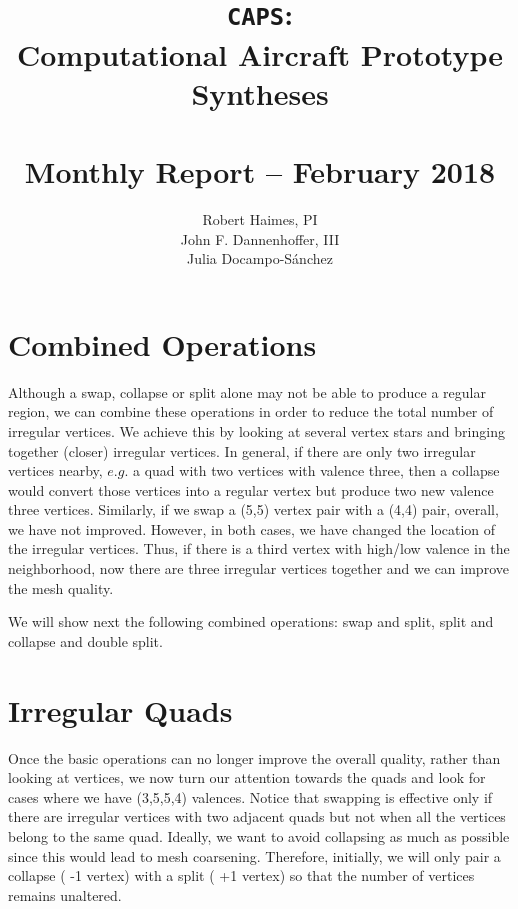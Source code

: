 \documentclass[titlepage]{article}
\title{{\tt CAPS}: \\ Computational Aircraft Prototype Syntheses \\ ~ \\ \Large Monthly Report -- February 2018\\[0.04in]
}
\author{Robert Haimes, PI \\ John F. Dannenhoffer, III
\\ Julia Docampo-S\'anchez
}
\begin{document}


  \maketitle

  \MakeRptDocPage
  

\newpage
  \section{Combined Operations}
  Although a swap, collapse or split alone may not be able to produce a regular region,  we can 
  combine these operations in order to reduce the total number of irregular vertices. We 
  achieve this by looking at several vertex stars and bringing together (closer) irregular vertices. 
   In general, if there are only two irregular vertices nearby, 
   $e.g.$ a quad with two vertices with valence three, then a collapse would convert those vertices 
   into a regular vertex but produce two new valence three vertices. Similarly, if we swap a (5,5) vertex 
   pair with  a (4,4) pair, overall, we have not improved. However, in both cases, we have changed 
   the location of the irregular vertices. Thus, if there is a third vertex with high/low valence in the 
   neighborhood, now there are three irregular vertices together and we can improve the mesh quality. 
   
   We will show next the following combined operations: swap and split, split and collapse and double split. 
  
  \section {Irregular Quads}
  Once the basic operations can no longer improve the overall quality, rather than looking at vertices, 
  we now turn our attention towards the quads and look for cases where we have (3,5,5,4) valences. 
  Notice that swapping is effective only if there are irregular vertices with two adjacent quads but 
  not when all the vertices belong to the same quad. Ideally, we want to avoid collapsing as much as possible since 
  this would lead to mesh coarsening. Therefore, initially, we will only pair a collapse ( -1 vertex) 
  with a split ( +1 vertex) so that the number of vertices remains unaltered. 
  
  
  
  
  
\end{document}
